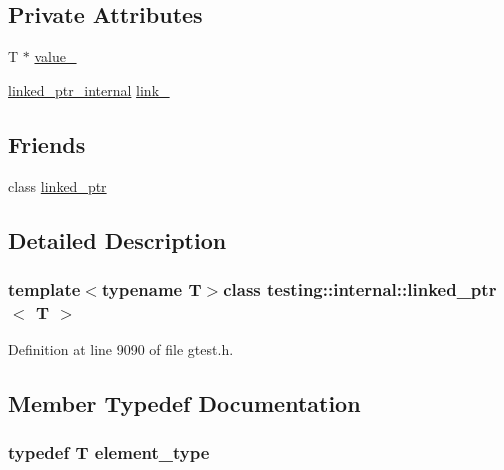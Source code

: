 \subsection*{\-Private \-Attributes}
\begin{DoxyCompactItemize}
\item 
\-T $\ast$ \hyperlink{classtesting_1_1internal_1_1linked__ptr_a4ddc1e6e173732d80915527e28056b48}{value\-\_\-}
\item 
\hyperlink{classtesting_1_1internal_1_1linked__ptr__internal}{linked\-\_\-ptr\-\_\-internal} \hyperlink{classtesting_1_1internal_1_1linked__ptr_a2b30a3c114fd9671da7e1536eb91f496}{link\-\_\-}
\end{DoxyCompactItemize}
\subsection*{\-Friends}
\begin{DoxyCompactItemize}
\item 
class \hyperlink{classtesting_1_1internal_1_1linked__ptr_acca82c4f17b0013840df5f6b0723ea40}{linked\-\_\-ptr}
\end{DoxyCompactItemize}


\subsection{\-Detailed \-Description}
\subsubsection*{template$<$typename \-T$>$class testing\-::internal\-::linked\-\_\-ptr$<$ T $>$}



\-Definition at line 9090 of file gtest.\-h.



\subsection{\-Member \-Typedef \-Documentation}
\hypertarget{classtesting_1_1internal_1_1linked__ptr_ae37fb942067e67c711beb897e7b7b5de}{
\subsubsection[{element\-\_\-type}]{\setlength{\rightskip}{0pt plus 5cm}typedef \-T {\bf element\-\_\-type}}}\label{d9/df4/classtesting_1_1internal_1_1linked__ptr_ae37fb942067e67c711beb897e7b7b5de}


